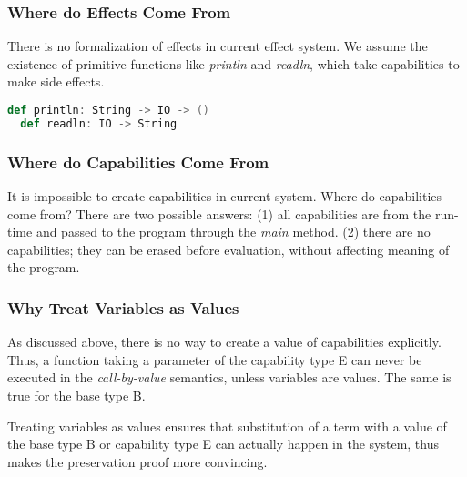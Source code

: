\subsubsection{Where do Effects Come From}

There is no formalization of effects in current effect system. We
assume the existence of primitive functions like \emph{println} and
\emph{readln}, which take capabilities to make side effects.

\begin{lstlisting}[language=Scala]
  def println: String -> IO -> ()
  def readln: IO -> String
\end{lstlisting}



\subsubsection{Where do Capabilities Come From}

It is impossible to create capabilities in current system. Where do
capabilities come from?  There are two possible answers: (1) all
capabilities are from the run-time and passed to the program through
the \emph{main} method. (2) there are no capabilities; they can be
erased before evaluation, without affecting meaning of the program.


\subsubsection{Why Treat Variables as Values}

As discussed above, there is no way to create a value of capabilities
explicitly. Thus, a function taking a parameter of the capability type
E can never be executed in the \emph{call-by-value} semantics, unless
variables are values. The same is true for the base type B.

Treating variables as values ensures that substitution of a term with
a value of the base type B or capability type E can actually happen in
the system, thus makes the preservation proof more convincing.


